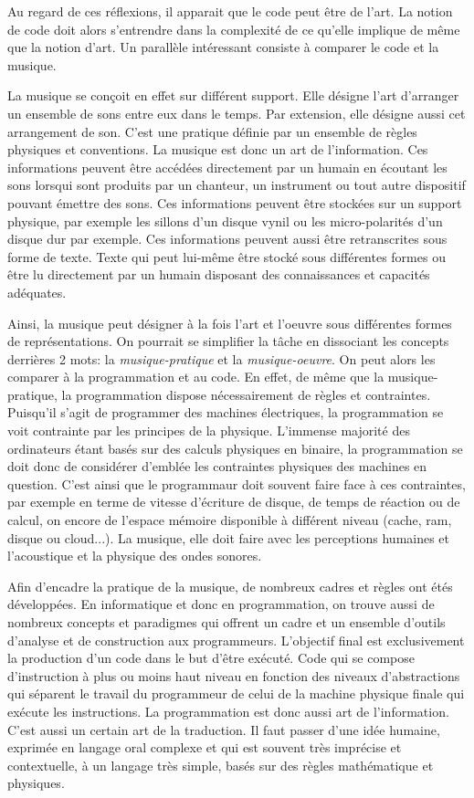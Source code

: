 \documentclass[12pt]{article} %
\begin{document}
Au regard de ces réflexions, il apparait que le code peut être de l'art. La notion de code doit alors s'entrendre dans la complexité de ce qu'elle implique de même que la notion d'art. Un parallèle intéressant consiste à comparer le code et la musique.

La musique se conçoit en effet sur différent support. Elle désigne l'art d'arranger un ensemble de sons entre eux dans le temps. Par extension, elle désigne aussi cet arrangement de son. C'est une pratique définie par un ensemble de règles physiques et conventions. La musique est donc un art de l'information. Ces informations peuvent être accédées directement par un humain en écoutant les sons lorsqui sont produits par un chanteur, un instrument ou tout autre dispositif pouvant émettre des sons. Ces informations peuvent être stockées sur un support physique, par exemple les sillons d'un disque vynil ou les micro-polarités d'un disque dur par exemple. Ces informations peuvent aussi être retranscrites sous forme de texte. Texte qui peut lui-même être stocké sous différentes formes ou être lu directement par un humain disposant des connaissances et capacités adéquates. 

Ainsi, la musique peut désigner à la fois l'art et l'oeuvre sous différentes formes de représentations. On pourrait se simplifier la tâche en dissociant les concepts derrières 2 mots: la \textit{musique-pratique} et la \textit{musique-oeuvre}. On peut alors les comparer à la programmation et au code. En effet, de même que la musique-pratique, la programmation dispose nécessairement de règles et contraintes. Puisqu'il s'agit de programmer des machines électriques, la programmation se voit contrainte par les principes de la physique. L'immense majorité des ordinateurs étant basés sur des calculs physiques en binaire, la programmation se doit donc de considérer d'emblée les contraintes physiques des machines en question. C'est ainsi que le programmaur doit souvent faire face à ces contraintes, par exemple en terme de vitesse d'écriture de disque, de temps de réaction ou de calcul, on encore de l'espace mémoire disponible à différent niveau (cache, \acrshort{ram}, disque ou cloud...). La musique, elle doit faire avec les perceptions humaines et l'acoustique et la physique des ondes sonores. 

Afin d'encadre la pratique de la musique, de nombreux cadres et règles ont étés développées. En informatique et donc en programmation, on trouve aussi de nombreux concepts et paradigmes qui offrent un cadre et un ensemble d'outils d'analyse et de construction aux programmeurs. L'objectif final est exclusivement la production d'un code dans le but d'être exécuté. Code qui se compose d'instruction à plus ou moins haut niveau en fonction des niveaux d'abstractions qui séparent le travail du programmeur de celui de la machine physique finale qui exécute les instructions. La programmation est donc aussi art de l'information. C'est aussi un certain art de la traduction. Il faut passer d'une idée humaine, exprimée en langage oral complexe et qui est souvent très imprécise et contextuelle, à un langage très simple, basés sur des règles mathématique et physiques. 
\end{document}
